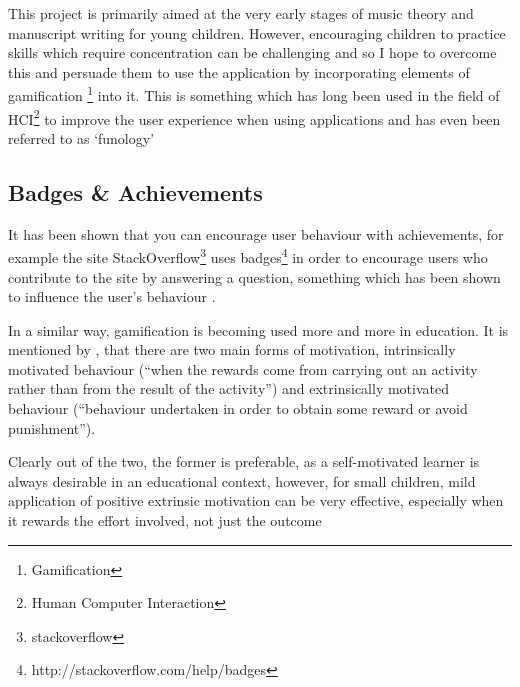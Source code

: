 This project is primarily aimed at the very early stages of music theory and manuscript writing for young children. However, encouraging children to practice skills which require concentration can be challenging and so I hope to overcome this and persuade them to use the application by incorporating elements of gamification \footnote{Gamification} into it. This is something which has long been used in the field of HCI\footnote{Human Computer Interaction} to improve the user experience when using applications and has even been referred to as `funology' \parencite{blythe2004funology}

\subsection*{Badges \& Achievements}
It has been shown that you can encourage user behaviour with achievements, for example the site StackOverflow\footnote{stackoverflow} uses badges\footnote{http://stackoverflow.com/help/badges} in order to encourage users who contribute to the site by answering a question, something which has been shown to influence the user's behaviour \parencite{MSR13p65}.

In a similar way, gamification is becoming used more and more in education. It is mentioned by \citeauthor{kapp2012gamification}\cite{kapp2012gamification}, that there are two main forms of motivation, intrinsically motivated behaviour (\enquote{when the rewards come from carrying out an activity rather than from the result of the activity}) and extrinsically motivated behaviour (\enquote{behaviour undertaken in order to obtain some reward or avoid punishment}).

Clearly out of the two, the former is preferable, as a self-motivated learner is always desirable in an educational context, however, for small children, mild application of positive extrinsic motivation can be very effective, especially when it rewards the effort involved, not just the outcome \parencite{motivate-kids-lifehacker}\cite{motivate-kids-lifehacker}
